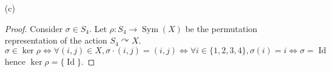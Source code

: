 \documentclass[12pt]{article}
\begin{document}
\begin{enumerate}
\begin{proof}
        Now consider $(1, 2) \in X$. $\sigma \in G_{(1, 2)} \iff \sigma \cdot (1, 2) = (1, 2) \iff \sigma(1) = 1, \sigma(2) = 2$.
        Thus
        \[ G_{(1, 2)} = \{ \sigma \in S_4: \sigma(1) = 1, \sigma(2) = 2 \} \]
        clearly any permutation in the stabilizer can freely permute $\{ 3, 4 \}$
        and therefore
        \[ |G_{(1, 2)}| = |S_2| = 2 \]
    \end{proof}

    \item[(c)]
    \begin{proof}
        Consider $\sigma \in S_4$. Let $\rho: S_4 \to \operatorname{Sym}(X)$ be the permutation
        representation of the action $S_4 \curvearrowright X$.
        \[ \sigma \in \ker \rho \iff \forall (i, j) \in X, \sigma \cdot (i, j) = (i, j) \iff \forall i \in \{1, 2, 3, 4 \}, \sigma(i) = i \iff \sigma = \operatorname{Id} \]
        hence $\ker \rho = \{ \operatorname{Id} \}$.
    \end{proof}
\end{enumerate}
\end{document}
